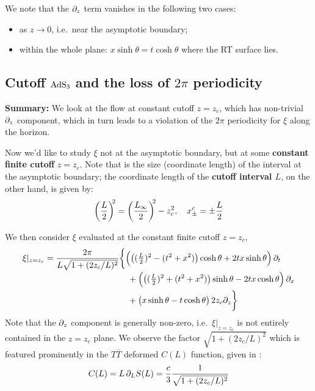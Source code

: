 \documentclass[11pt,a4paper]{article}
\begin{document}
	We note that the $\partial_{z}$ term vanishes in the following two cases:
	\begin{itemize}[noitemsep,topsep=0pt]
	\item as $z\to 0$, i.e.~near the asymptotic boundary;
	\item within the whole plane: $
			x\sinh\theta
			= t\cosh\theta
		$ where the RT surface lies. 
	\end{itemize}
	
\FloatBarrier
\pagebreak
\subsection{Cutoff $\mathrm{AdS}_3$ and the loss of $2\pi$ periodicity}

\textbf{Summary:} We look at the flow at constant cutoff $z = z_c$, which has non-trivial $\partial_{z}$ component, which in turn leads to a violation of the $2\pi$ periodicity for $\xi$ along the horizon.
	
	Now we'd like to study $\xi$ not at the asymptotic boundary, but at some \textbf{constant finite cutoff} $z = z_c$. 
	Note that is the size (coordinate length) of the interval at the {asymptotic boundary}; the coordinate length of the \textbf{cutoff interval $L$}, on the other hand, is given by:
	\begin{equation}
		\pqty{\frac{L}{2}}^{\!\!2}
		= \pqty{\frac{L_\infty}{2}}^{\!\!2} - z_c^2,
	\quad
		x_\pm^c
		= \pm \frac{L}{2}
	\label{eq:length_relations}
	\end{equation}
	
	We then consider $\xi$ evaluated at the {constant finite cutoff} $z = z_c$,
	\begin{equation}
	\begin{aligned}
		\xi|_{z=z_c}
		= \frac{2\pi}{
				L\sqrt{1 + (2z_c/L)^2}
			}
		& \bigg\{
			\pqty\Big{
				\pqty{
					(\tfrac{L}{2})^2
					- (t^2 + x^2)
				} \cosh\theta
				+ 2tx \sinh\theta
			} \,\pdd{t}
		\\[-.5ex] &\quad 
			+ \pqty\Big{
				\pqty{
					(\tfrac{L}{2})^2
					+ (t^2 + x^2)
				} \sinh\theta
				- 2tx \cosh\theta
			} \,\pdd{x}
		\\ &\quad 
			+ \pqty\big{
				x\sinh\theta
				- t\cosh\theta
			} \,2z_c\pdd{z}
		\bigg\}
	\end{aligned}
	\end{equation}
	Note that the $\partial_{z}$ component is generally non-zero, i.e.~$\xi|_{z=z_c}$ is not entirely contained in the $z = z_c$ plane. 
	We observe the factor $
		\sqrt{1 + (2z_c/L)^2}
	$ which is featured prominently in the $T\bar{T}$ deformed $C(L)$ function, given in \cite{Lewkowycz:2019xse}:
	\begin{equation}
		C(L) = L\,\partial_{L} S(L)
		= \frac{c}{3} 
			\frac{1}{
				\sqrt{1 + (2z_c/L)^2}
			}
	\end{equation}
	
\end{document}
